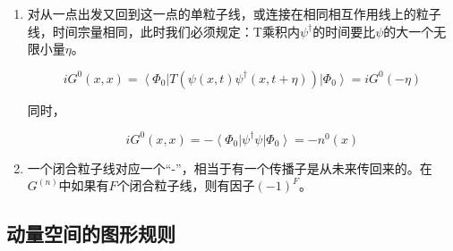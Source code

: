 \begin{enumerate}
\item

对从一点出发又回到这一点的单粒子线，或连接在相同相互作用线上的粒子线，时间宗量相同，此时我们必须规定：T乘积内$\psi^\dagger$的时间要比$\psi$的大一个无限小量$\eta$。

\begin{equation}
i G^0 (x , x) = \left\langle \Phi_0 \right|  T (\psi(x,t) \psi^\dagger (x,t+\eta) ) \left| \Phi_0 \right\rangle = iG^0 (-\eta)
\end{equation}

同时，

\begin{equation}
i G^0 (x , x) = - \left\langle \Phi_0 \right| \psi^\dagger  \psi   \left| \Phi_0 \right\rangle = - n^0 (x)
\end{equation}

\item 

一个闭合粒子线对应一个“-”，相当于有一个传播子是从未来传回来的。在$G^{(n)}$中如果有$F$个闭合粒子线，则有因子$(-1)^F$。

\end{enumerate}


\subsection{动量空间的图形规则}


